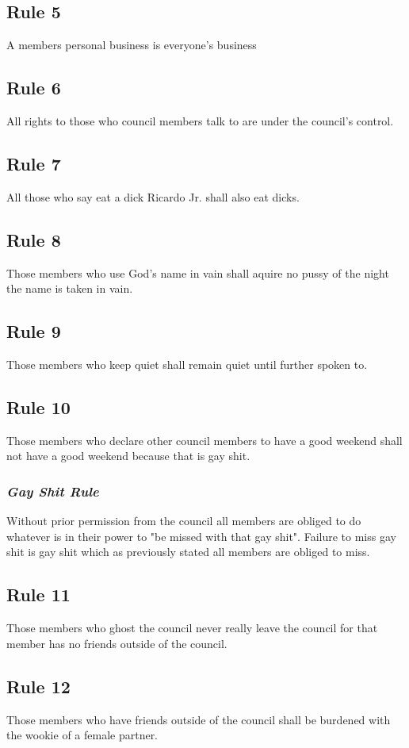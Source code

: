 \documentclass[letterpaper]{article}
\begin{document}
\subsection{Rule 5}
A members personal business is everyone's business

\subsection{Rule 6}
All rights to those who council members talk to are under the council's control.

\subsection{Rule 7}
All those who say eat a dick Ricardo Jr. shall also eat dicks.

\subsection{Rule 8}
Those members who use God's name in vain shall aquire no pussy of the night the name is taken in vain.

\subsection{Rule 9}
Those members who keep quiet shall remain quiet until further spoken to.

\subsection{Rule 10}
Those members who declare other council members to have a good weekend shall not have a good weekend because that is gay shit.
\subsubsection{\textit{Gay Shit Rule}}
Without prior permission from the council all members are obliged to do whatever is in their power to "be missed with that gay shit". Failure to miss gay shit is gay shit which as previously stated all members are obliged to miss.

\subsection{Rule 11}
Those members who ghost the council never really leave the council for that member has no friends outside of the council.

\subsection{Rule 12}
Those members who have friends outside of the council shall be burdened with the wookie of a female partner.
\end{document}
